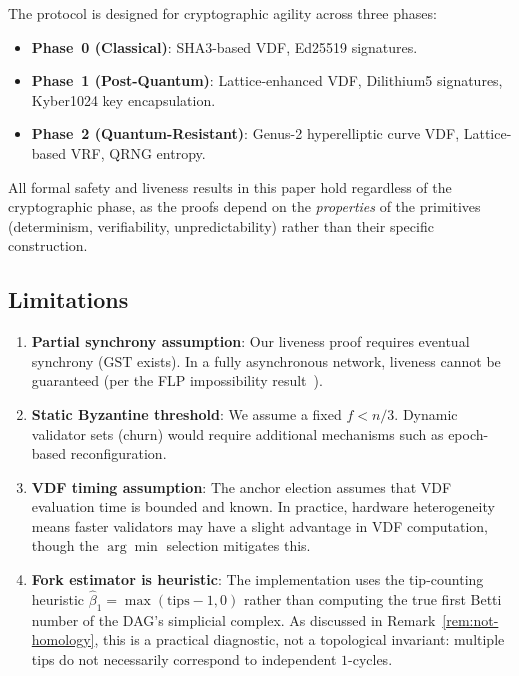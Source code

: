 \documentclass[11pt,a4paper]{article}
\theoremstyle{definition}
\theoremstyle{remark}
\newcommand{\GST}{\mathrm{GST}}
\begin{document}
The protocol is designed for cryptographic agility across three phases:
\begin{itemize}[nosep]
  \item \textbf{Phase~0 (Classical)}: SHA3-based VDF, Ed25519 signatures.
  \item \textbf{Phase~1 (Post-Quantum)}: Lattice-enhanced VDF,
    Dilithium5 signatures, Kyber1024 key encapsulation.
  \item \textbf{Phase~2 (Quantum-Resistant)}: Genus-2 hyperelliptic
    curve VDF, Lattice-based VRF, QRNG entropy.
\end{itemize}
All formal safety and liveness results in this paper hold regardless of
the cryptographic phase, as the proofs depend on the \emph{properties}
of the primitives (determinism, verifiability, unpredictability) rather
than their specific construction.

\subsection{Limitations}

\begin{enumerate}[leftmargin=*]
  \item \textbf{Partial synchrony assumption}: Our liveness proof requires
    eventual synchrony ($\GST$ exists). In a fully asynchronous network,
    liveness cannot be guaranteed (per the FLP impossibility
    result~\cite{fischer1985impossibility}).

  \item \textbf{Static Byzantine threshold}: We assume a fixed $f < n/3$.
    Dynamic validator sets (churn) would require additional mechanisms
    such as epoch-based reconfiguration.

  \item \textbf{VDF timing assumption}: The anchor election assumes that
    VDF evaluation time is bounded and known. In practice, hardware
    heterogeneity means faster validators may have a slight advantage in
    VDF computation, though the $\arg\min$ selection mitigates this.

  \item \textbf{Fork estimator is heuristic}: The implementation uses
    the tip-counting heuristic $\hat{\beta}_1 = \max(\text{tips} - 1, 0)$
    rather than computing the true first Betti number of the DAG's
    simplicial complex.
    As discussed in Remark~\ref{rem:not-homology}, this is a practical
    diagnostic, not a topological invariant: multiple tips do not
    necessarily correspond to independent $1$-cycles.
\end{enumerate}
\end{document}
